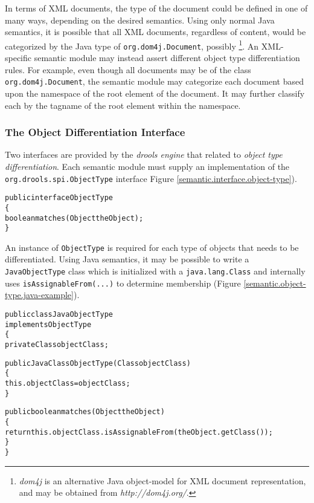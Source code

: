\documentclass[10pt,letterpaper]{article}
\newenvironment{codelisting}%
	{\begin{minipage}{250pt}\small\begin{alltt}}%
	{\end{alltt}\end{minipage}}
\begin{document}
In terms of XML documents, the type of the document could be defined
in one of many ways, depending on the desired semantics.  Using only normal
Java semantics, it is possible that all XML documents, regardless of
content, would be categorized by the Java type of
\verb|org.dom4j.Document|, possibly%
	\footnote{\emph{dom4j} is an alternative Java object-model 
		for XML document representation, and may be obtained 
		from \emph{http://dom4j.org/}.}.
An XML-specific semantic module may instead assert different object
type differentiation rules.  For example, even though all documents
may be of the class \verb|org.dom4j.Document|, the semantic module
may categorize each document based upon the namespace of the root
element of the document.  It may further classify each by the tagname
of the root element within the namespace.

\subsubsection{The Object Differentiation Interface}

Two interfaces are provided by the \emph{drools engine} that related
to \emph{object type differentiation}.  Each semantic module must 
supply an implementation of the \verb|org.drools.spi.ObjectType| 
interface Figure \ref{semantic.interface.object-type}).

\begin{figure*}
	\begin{codelisting}
	public interface ObjectType
	\{
	     boolean matches(Object theObject);
	\}
	\end{codelisting}
	\caption{The \emph{ObjectType} interface.}
	\label{semantic.interface.object-type}
\end{figure*}

An instance of \verb|ObjectType| is required for each type of objects
that needs to be differentiated.  Using Java semantics, it may be
possible to write a \verb|JavaObjectType| class which is 
initialized with a \verb|java.lang.Class| and internally uses
\verb|isAssignableFrom(...)| to determine membership 
(Figure \ref{semantic.object-type.java-example}).

\begin{figure*}
	\begin{codelisting}
	public class JavaObjectType 
	             implements ObjectType
	\{
	     private Class objectClass;

	     public JavaClassObjectType(Class objectClass)
	     \{
	          this.objectClass = objectClass;
	     \}

	     public boolean matches(Object theObject)
	     \{
	          return this.objectClass.isAssignableFrom( theObject.getClass() );
	     \}
	\}
	\end{codelisting}
	\caption{Example \emph{ObjectType} implementing Java class semantics, including polymorphism.} 
	\label{semantic.object-type.java-example}
\end{figure*}
\end{document}
